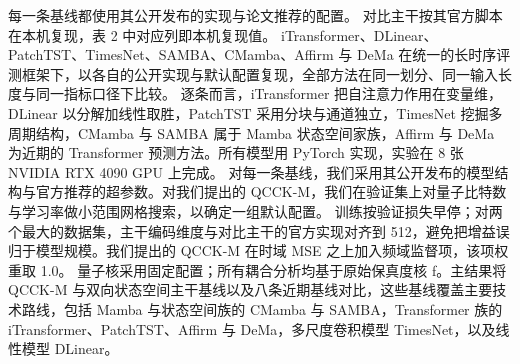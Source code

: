 每一条基线都使用其公开发布的实现与论文推荐的配置。
对比主干按其官方脚本在本机复现，表 2 中对应列即本机复现值。
iTransformer、DLinear、PatchTST、TimesNet、SAMBA、CMamba、Affirm 与 DeMa 在统一的长时序评测框架下，以各自的公开实现与默认配置复现，全部方法在同一划分、同一输入长度与同一指标口径下比较。
逐条而言，iTransformer\cite{liu2024itransformer} 把自注意力作用在变量维，DLinear\cite{zeng2023dlinear} 以分解加线性取胜，PatchTST\cite{nie2023patchtst} 采用分块与通道独立，TimesNet\cite{wu2023timesnet} 挖掘多周期结构，CMamba 与 SAMBA 属于 Mamba\cite{gu2024mamba} 状态空间家族，Affirm 与 DeMa\cite{an2026dema} 为近期的 Transformer 预测方法。所有模型用 PyTorch 实现，实验在 8 张 NVIDIA RTX 4090 GPU 上完成。
对每一条基线，我们采用其公开发布的模型结构与官方推荐的超参数。对我们提出的 QCCK-M，我们在验证集上对量子比特数与学习率做小范围网格搜索，以确定一组默认配置。
训练按验证损失早停；对两个最大的数据集，主干编码维度与对比主干的官方实现对齐到 512，避免把增益误归于模型规模。我们提出的 QCCK-M 在时域 MSE 之上加入频域监督项\cite{wang2025fredf}，该项权重取 1.0。
量子核采用固定配置；所有耦合分析均基于原始保真度核 f。主结果将 QCCK-M 与双向状态空间主干基线以及八条近期基线对比，这些基线覆盖主要技术路线，包括 Mamba 与状态空间族的 CMamba 与 SAMBA，Transformer 族的 iTransformer、PatchTST、Affirm 与 DeMa，多尺度卷积模型 TimesNet，以及线性模型 DLinear。

